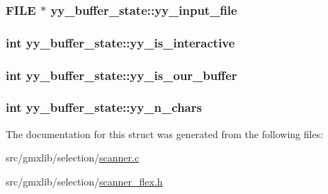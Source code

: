 \hypertarget{structyy__buffer__state_a4360acfb226a1fc240ab2be17dd6beda}{
\subsubsection[{yy\-\_\-input\-\_\-file}]{\setlength{\rightskip}{0pt plus 5cm}\-F\-I\-L\-E $\ast$ {\bf yy\-\_\-buffer\-\_\-state\-::yy\-\_\-input\-\_\-file}}}\label{structyy__buffer__state_a4360acfb226a1fc240ab2be17dd6beda}
\hypertarget{structyy__buffer__state_abf5c70eea75581b58c0ee7bd31b14490}{
\subsubsection[{yy\-\_\-is\-\_\-interactive}]{\setlength{\rightskip}{0pt plus 5cm}int {\bf yy\-\_\-buffer\-\_\-state\-::yy\-\_\-is\-\_\-interactive}}}\label{structyy__buffer__state_abf5c70eea75581b58c0ee7bd31b14490}
\hypertarget{structyy__buffer__state_a80ce2431c70dc4f89ced487f18449465}{
\subsubsection[{yy\-\_\-is\-\_\-our\-\_\-buffer}]{\setlength{\rightskip}{0pt plus 5cm}int {\bf yy\-\_\-buffer\-\_\-state\-::yy\-\_\-is\-\_\-our\-\_\-buffer}}}\label{structyy__buffer__state_a80ce2431c70dc4f89ced487f18449465}
\hypertarget{structyy__buffer__state_a06406208824817acfec2183b79080945}{
\subsubsection[{yy\-\_\-n\-\_\-chars}]{\setlength{\rightskip}{0pt plus 5cm}int {\bf yy\-\_\-buffer\-\_\-state\-::yy\-\_\-n\-\_\-chars}}}\label{structyy__buffer__state_a06406208824817acfec2183b79080945}


\-The documentation for this struct was generated from the following files\-:\begin{DoxyCompactItemize}
\item 
src/gmxlib/selection/\hyperlink{scanner_8c}{scanner.\-c}\item 
src/gmxlib/selection/\hyperlink{scanner__flex_8h}{scanner\-\_\-flex.\-h}\end{DoxyCompactItemize}
